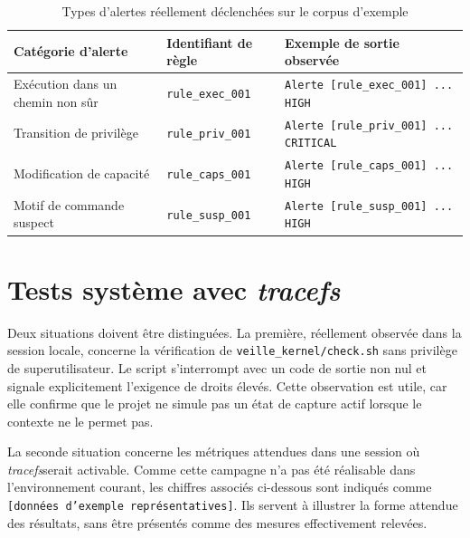 \documentclass[12pt,a4paper]{report}
\newcommand{\tracefs}{\textit{tracefs}}
\begin{document}
\begin{table}[h]
\centering
\begin{tabular}{>{\raggedright\arraybackslash}p{3.8cm} >{\raggedright\arraybackslash}p{3.2cm} >{\raggedright\arraybackslash}p{5.3cm}}
\toprule
Catégorie d’alerte & Identifiant de règle & Exemple de sortie observée \\
\midrule
Exécution dans un chemin non sûr & \texttt{rule\_exec\_001} & \texttt{Alerte [rule\_exec\_001] ... HIGH} \\
Transition de privilège & \texttt{rule\_priv\_001} & \texttt{Alerte [rule\_priv\_001] ... CRITICAL} \\
Modification de capacité & \texttt{rule\_caps\_001} & \texttt{Alerte [rule\_caps\_001] ... HIGH} \\
Motif de commande suspect & \texttt{rule\_susp\_001} & \texttt{Alerte [rule\_susp\_001] ... HIGH} \\
\bottomrule
\end{tabular}
\caption{Types d’alertes réellement déclenchées sur le corpus d’exemple}
\end{table}

\section{Tests système avec \tracefs}
Deux situations doivent être distinguées. La première, réellement observée dans la session locale, concerne la vérification de \texttt{veille\_kernel/check.sh} sans privilège de superutilisateur. Le script s’interrompt avec un code de sortie non nul et signale explicitement l’exigence de droits élevés. Cette observation est utile, car elle confirme que le projet ne simule pas un état de capture actif lorsque le contexte ne le permet pas.

La seconde situation concerne les métriques attendues dans une session où \tracefs serait activable. Comme cette campagne n’a pas été réalisable dans l’environnement courant, les chiffres associés ci-dessous sont indiqués comme \texttt{[données d'exemple représentatives]}. Ils servent à illustrer la forme attendue des résultats, sans être présentés comme des mesures effectivement relevées.
\end{document}

